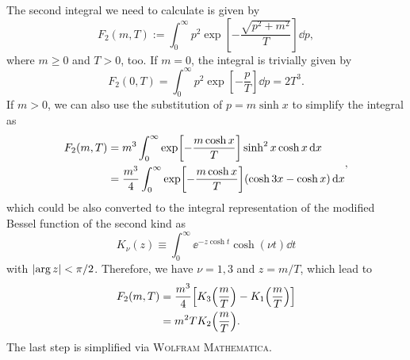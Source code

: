 \documentclass{article}
\begin{document}
            The second integral we need to calculate is given by
            \begin{equation}
                F_2(m, T) := \int_0^\infty p^2 \exp[-\frac{\sqrt{p^2 + m^2}}{T}] \dd{p},
                \label{eq:F_2-definition}
            \end{equation}
            where $m \ge 0$ and $T > 0$, too.
            If $m = 0$, the integral is trivially given by
            \begin{equation}
                F_2(0, T) = \int_0^\infty p^2 \exp[-\frac{p}{T}] \dd{p} = 2 T^3.
                \label{eq:F_2-evaluation-m=0}
            \end{equation}
            If $m > 0$, we can also use the substitution of $p = m \sinh x$ to simplify the integral as
            \begin{equation}
                \begin{aligned}
                    F_2(m, T) & = m^3 \int_0^\infty \exp[-\frac{m \cosh x}{T}] \sinh^2 x \cosh x \dd{x} \\
                    & = \frac{m^3}{4} \int_0^\infty \exp[-\frac{m \cosh x}{T}] \qty(\cosh 3 x - \cosh x) \dd{x} \\
                \end{aligned},
            \end{equation}
            which could be also converted to the integral representation of the modified Bessel function of the second kind as \cite[Eq.~(\href{https://dlmf.nist.gov/10.32.9}{10.32.9})]{NIST:DLMF}
            \begin{equation}
                K_\nu(z) \equiv \int_0^\infty \ee^{-z \cosh t} \cosh(\nu t) \dd{t}
            \end{equation}
            with $\abs{\arg z} < \pi / 2$.
            Therefore, we have $\nu = 1, 3$ and $z = m / T$, which lead to
            \begin{equation}
                \begin{aligned}
                    F_2(m, T) & = \frac{m^3}{4} \qty[K_3\qty(\frac{m}{T}) - K_1\qty(\frac{m}{T})] \\
                    & = m^2 T K_2\qty(\frac{m}{T}).
                \end{aligned}
                \label{eq:F_2-evaluation}
            \end{equation}
            The last step is simplified via \textsc{Wolfram Mathematica}.
\end{document}
